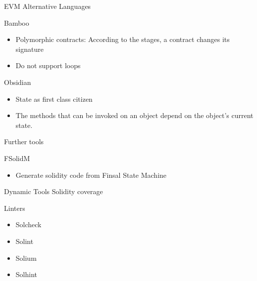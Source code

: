 

\begin{frame}{EVM Alternative Languages}
\begin{block}{Bamboo~\cite{bamboo}}
\begin{itemize}
\item Polymorphic contracts: According to the stages, a contract changes its signature
\item Do not support loops
\end{itemize}
\end{block}

\begin{block}{Obsidian~\cite{obsidian}}
  \begin{itemize}
  \item State as first class citizen
  \item The methods that can be invoked on an object depend on the object’s current state.
  \end{itemize}
\end{block}
\end{frame}


\begin{frame}{Further tools}

\begin{block}{FSolidM~\cite{bib:FSolidM}}
\begin{itemize}
\item Generate solidity code from Finsal State Machine
\end{itemize}
\end{block}

\begin{block}{Dynamic Tools}
Solidity coverage
\end{block}

\begin{block}{Linters}
\begin{itemize}
\item Solcheck
\item Solint
\item Solium
\item Solhint
\end{itemize}
\end{block}


\end{frame}
